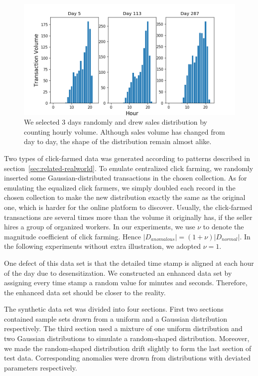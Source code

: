 \documentclass[10pt,conference,letterpaper]{article}
\begin{document}
			\begin{figure}[!t]
				\centering
				\includegraphics[width=\linewidth]{fig/SaleDistributions.png}
				\caption{We selected 3 days randomly and drew sales distribution by counting hourly volume. Although sales volume has changed from day to day, the shape of the distribution remain almost alike.}
				\label{fig:sale-distribution-sample}
			\end{figure}
			
			Two types of click-farmed data was generated according to patterns described in section~\ref{sec:related-realworld}. To emulate centralized click farming, we randomly inserted some Gaussian-distributed transactions in the chosen collection. As for emulating the equalized click farmers, we simply doubled each record in the chosen collection to make the new distribution exactly the same as the original one, which is harder for the online platform to discover.
			Usually, the click-farmed transactions are several times more than the volume it originally has, if the seller hires a group of organized workers. In our experiments, we use $\nu$ to denote the magnitude coefficient of click farming. Hence $|D_{anomalous}| = (1 + \nu)|D_{normal}|$. In the following experiments without extra illustration, we adopted $\nu = 1$.
			
			One defect of this data set is that the detailed time stamp is aligned at each hour of the day due to desensitization. We constructed an enhanced data set by assigning every time stamp a random value for minutes and seconds. Therefore, the enhanced data set should be closer to the reality.
			
			The synthetic data set was divided into four sections. First two sections contained sample sets drawn from a uniform and a Gaussian distribution respectively. The third section used a mixture of one uniform distribution and two Gaussian distributions to simulate a random-shaped distribution. Moreover, we made the random-shaped distribution drift slightly to form the last section of test data. Corresponding anomalies were drown from distributions with deviated parameters respectively.
	
\end{document}
